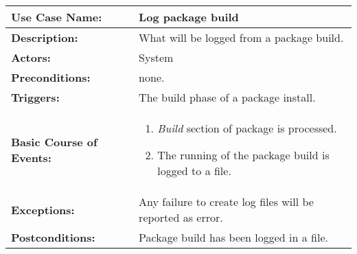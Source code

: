 
\begin{tabularx}{\linewidth}{|l|X|}
\hline
\textbf{Use Case Name:} & \textbf{Log package build} \\
\hline
\textbf{Description:} & 
What will be logged from a package build. \\
\hline
\textbf{Actors:} & System \\
\hline
\textbf{Preconditions:} & none. \\
\hline
\textbf{Triggers:} & The build phase of a package install. \\
\hline
\textbf{Basic Course of Events:} & 
\begin{minipage}{\linewidth} 
  \vspace{0.05em}
  \begin{enumerate}
    \item \emph{Build} section of package is processed.
    \item The running of the package build is logged to a file.
  \end{enumerate}
  \vspace{0.05em}
\end{minipage}
\\
\hline
\textbf{Exceptions:} & 
Any failure to create log files will be reported as error. \\
\hline 
\textbf{Postconditions:} &
Package build has been logged in a file. \\
\hline
\end{tabularx}


